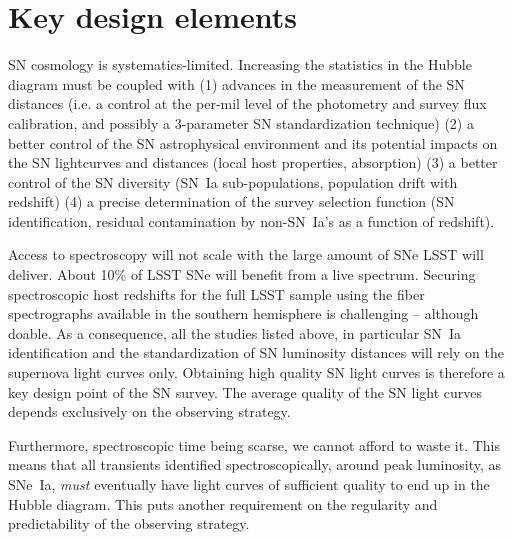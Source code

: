 \documentclass [11pt,a4paper]{article}
\begin{document}
\renewcommand\appendix{\par
  \setcounter{section}{0}
  \setcounter{subsection}{0}
  \setcounter{figure}{0}
  \setcounter{table}{0}
  \renewcommand\thesection{Appendix} %
  \renewcommand\thefigure{\Alph{section}\arabic{figure}}
  \renewcommand\thetable{\Alph{section}\arabic{table}} 
}
 

\tableofcontents



\section{Key design elements}

SN cosmology is systematics-limited.  Increasing the statistics in the
Hubble diagram must be coupled with (1) advances in the measurement of
the SN distances (i.e.  a control at the per-mil level of the
photometry and survey flux calibration, and possibly a 3-parameter SN
standardization technique) (2) a better control of the SN
astrophysical environment and its potential impacts on the SN
lightcurves and distances (local host properties, absorption) (3) a
better control of the SN diversity (SN~Ia sub-populations, population
drift with redshift) (4) a precise determination of the survey
selection function (SN identification, residual contamination by
non-SN~Ia's as a function of redshift).

Access to spectroscopy will not scale with the large amount of SNe
LSST will deliver.  About 10\% of LSST SNe will benefit from a live
spectrum.  Securing spectroscopic host redshifts for the full LSST
sample using the fiber spectrographs available in the southern
hemisphere is challenging -- although doable.  As a consequence, all
the studies listed above, in particular SN~Ia identification and the
standardization of SN luminosity distances will rely on the supernova
light curves only.  Obtaining high quality SN light curves is
therefore a key design point of the SN survey.  The average quality of
the SN light curves depends exclusively on the observing strategy.

Furthermore, spectroscopic time being scarse, we cannot afford to
waste it.  This means that all transients identified
spectroscopically, around peak luminosity, as SNe~Ia, {\em must}
eventually have light curves of sufficient quality to end up in the
Hubble diagram.  This puts another requirement on the regularity and
predictability of the observing strategy.
\end{document}
